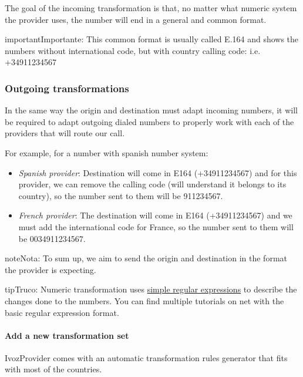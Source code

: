 \documentclass[letterpaper,10pt,spanish]{sphinxmanual}
\begin{document}
The goal of the incoming transformation is that, no matter what numeric system
the provider uses, the number will end in a general and common format.
\label{administration_portal/brand/settings/numeric_transformations:e164}
\begin{notice}{important}{Importante:}
This common format is usually called E.164 and shows the numbers
without international code, but with country calling code: i.e. +34911234567
\end{notice}


\subsubsection{Outgoing transformations}
\label{administration_portal/brand/settings/numeric_transformations:outgoing-transformations}
In the same way the origin and destination must adapt incoming numbers, it
will be required to adapt outgoing dialed numbers to properly work with each
of the providers that will route our call.

For example, for a number with spanish number system:
\begin{itemize}
\item {} 
\emph{Spanish provider}: Destination will come in E164 (+34911234567) and for this
provider, we can remove the calling code (will understand it belongs to
its country), so the number sent to them will be 911234567.

\item {} 
\emph{French provider}: The destination will come in E164 (+34911234567) and we must
add the international code for France, so the number sent to them will be
0034911234567.

\end{itemize}

\begin{notice}{note}{Nota:}
To sum up, we aim to send the origin and destination in the format the
provider is expecting.
\end{notice}

\begin{notice}{tip}{Truco:}
Numeric transformation uses \href{https://es.wikipedia.org/wiki/Expresi\%C3\%B3n\_regular}{simple regular expressions} to describe the
changes done to the numbers. You can find multiple tutorials on net with the
basic regular expression format.
\end{notice}


\paragraph{Add a new transformation set}
\label{administration_portal/brand/settings/numeric_transformations:add-a-new-transformation-set}
IvozProvider comes with an automatic transformation rules generator that fits
with most of the countries.
\end{document}
